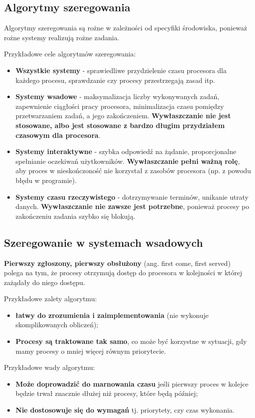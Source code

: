 \documentclass{article}
\begin{document}
\subsection{Algorytmy szeregowania}
Algorytmy szeregowania są rożne w zależności od specyfiki środowiska, ponieważ rożne systemy realizują rożne zadania.

Przykładowe cele algorytmów szeregowania:
\begin{itemize}
    \item \textbf{Wszystkie systemy} - sprawiedliwe przydzielenie czasu procesora dla każdego procesu, sprawdzanie czy procesy przestrzegają zasad itp.
    \item \textbf{Systemy wsadowe} - maksymalizacja liczby wykonywanych zadań, zapewnienie ciągłości pracy procesora, minimalizacja czasu pomiędzy przetwarzaniem zadań, a jego zakończeniem. \textbf{Wywłaszczanie nie jest stosowane, albo jest stosowane z bardzo długim przydziałem czasowym dla procesora}.
    \item \textbf{Systemy interaktywne} - szybka odpowiedź na żądanie, proporcjonalne spełnianie oczekiwań użytkowników. \textbf{Wywłaszczanie pełni ważną rolę}, aby proces w nieskończoność nie korzystał z zasobów procesora (np. z powodu błędu w programie).
    \item \textbf{Systemy czasu rzeczywistego} - dotrzymywanie terminów, unikanie utraty danych. \textbf{Wywłaszczanie nie zawsze jest potrzebne}, ponieważ procesy po zakończeniu zadania szybko się blokują.
\end{itemize}

\subsection*{Szeregowanie w systemach wsadowych}
\textbf{Pierwszy zgłoszony, pierwszy obsłużony} (ang. first come, first served) polega na tym, że procesy otrzymują dostęp do procesora w kolejności w której zażądały do niego dostępu.

Przykładowe zalety algorytmu:
\begin{itemize}
    \item \textbf{łatwy do zrozumienia i zaimplementowania} (nie wykonuje skomplikowanych obliczeń);
    \item \textbf{Procesy są traktowane tak samo}, co może być korzystne w sytuacji, gdy mamy procesy o mniej więcej równym priorytecie.
\end{itemize}

Przykładowe wady algorytmu:
\begin{itemize}
    \item \textbf{Może doprowadzić do marnowania czasu} jeśli pierwszy proces w kolejce będzie trwał znacznie dłużej niż procesy, które będą później;
    \item \textbf{Nie dostosowuje się do wymagań} tj. priorytety, czy czas wykonania.
\end{itemize}
\end{document}

